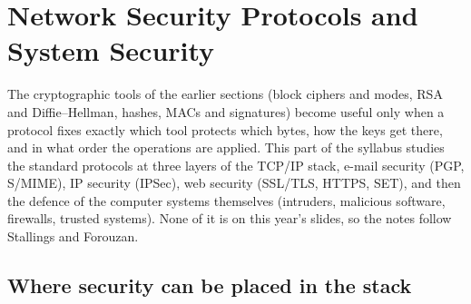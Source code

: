\usetikzlibrary{decorations.pathreplacing,shapes.symbols}
\providecommand{\nsrect}[6]{\draw[fill=#6] (#1,#2) rectangle ++(#3,#4); \node[font=\scriptsize, align=center, inner sep=0pt] at (#1+#3/2,#2+#4/2) {#5};}%

\section{Network Security Protocols and System Security}\label{sec:netsec}

The cryptographic tools of the earlier sections (block ciphers and modes, RSA and Diffie--Hellman, hashes, MACs and signatures) become useful only when a protocol fixes exactly which tool protects which bytes, how the keys get there, and in what order the operations are applied. This part of the syllabus studies the standard protocols at three layers of the TCP/IP stack, e-mail security (PGP, S/MIME), IP security (IPSec), web security (SSL/TLS, HTTPS, SET), and then the defence of the computer systems themselves (intruders, malicious software, firewalls, trusted systems). None of it is on this year's slides, so the notes follow Stallings and Forouzan.

\subsection{Where security can be placed in the stack \new}

